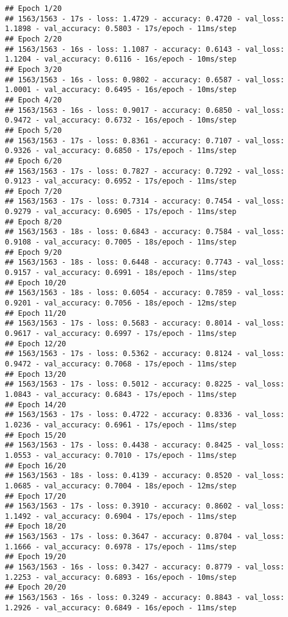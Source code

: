 \documentclass[
]{article}
\begin{document}
\begin{verbatim}
## Epoch 1/20
## 1563/1563 - 17s - loss: 1.4729 - accuracy: 0.4720 - val_loss: 1.1898 - val_accuracy: 0.5803 - 17s/epoch - 11ms/step
## Epoch 2/20
## 1563/1563 - 16s - loss: 1.1087 - accuracy: 0.6143 - val_loss: 1.1204 - val_accuracy: 0.6116 - 16s/epoch - 10ms/step
## Epoch 3/20
## 1563/1563 - 16s - loss: 0.9802 - accuracy: 0.6587 - val_loss: 1.0001 - val_accuracy: 0.6495 - 16s/epoch - 10ms/step
## Epoch 4/20
## 1563/1563 - 16s - loss: 0.9017 - accuracy: 0.6850 - val_loss: 0.9472 - val_accuracy: 0.6732 - 16s/epoch - 10ms/step
## Epoch 5/20
## 1563/1563 - 17s - loss: 0.8361 - accuracy: 0.7107 - val_loss: 0.9326 - val_accuracy: 0.6850 - 17s/epoch - 11ms/step
## Epoch 6/20
## 1563/1563 - 17s - loss: 0.7827 - accuracy: 0.7292 - val_loss: 0.9123 - val_accuracy: 0.6952 - 17s/epoch - 11ms/step
## Epoch 7/20
## 1563/1563 - 17s - loss: 0.7314 - accuracy: 0.7454 - val_loss: 0.9279 - val_accuracy: 0.6905 - 17s/epoch - 11ms/step
## Epoch 8/20
## 1563/1563 - 18s - loss: 0.6843 - accuracy: 0.7584 - val_loss: 0.9108 - val_accuracy: 0.7005 - 18s/epoch - 11ms/step
## Epoch 9/20
## 1563/1563 - 18s - loss: 0.6448 - accuracy: 0.7743 - val_loss: 0.9157 - val_accuracy: 0.6991 - 18s/epoch - 11ms/step
## Epoch 10/20
## 1563/1563 - 18s - loss: 0.6054 - accuracy: 0.7859 - val_loss: 0.9201 - val_accuracy: 0.7056 - 18s/epoch - 12ms/step
## Epoch 11/20
## 1563/1563 - 17s - loss: 0.5683 - accuracy: 0.8014 - val_loss: 0.9617 - val_accuracy: 0.6997 - 17s/epoch - 11ms/step
## Epoch 12/20
## 1563/1563 - 17s - loss: 0.5362 - accuracy: 0.8124 - val_loss: 0.9472 - val_accuracy: 0.7068 - 17s/epoch - 11ms/step
## Epoch 13/20
## 1563/1563 - 17s - loss: 0.5012 - accuracy: 0.8225 - val_loss: 1.0843 - val_accuracy: 0.6843 - 17s/epoch - 11ms/step
## Epoch 14/20
## 1563/1563 - 17s - loss: 0.4722 - accuracy: 0.8336 - val_loss: 1.0236 - val_accuracy: 0.6961 - 17s/epoch - 11ms/step
## Epoch 15/20
## 1563/1563 - 17s - loss: 0.4438 - accuracy: 0.8425 - val_loss: 1.0553 - val_accuracy: 0.7010 - 17s/epoch - 11ms/step
## Epoch 16/20
## 1563/1563 - 18s - loss: 0.4139 - accuracy: 0.8520 - val_loss: 1.0685 - val_accuracy: 0.7004 - 18s/epoch - 12ms/step
## Epoch 17/20
## 1563/1563 - 17s - loss: 0.3910 - accuracy: 0.8602 - val_loss: 1.1492 - val_accuracy: 0.6904 - 17s/epoch - 11ms/step
## Epoch 18/20
## 1563/1563 - 17s - loss: 0.3647 - accuracy: 0.8704 - val_loss: 1.1666 - val_accuracy: 0.6978 - 17s/epoch - 11ms/step
## Epoch 19/20
## 1563/1563 - 16s - loss: 0.3427 - accuracy: 0.8779 - val_loss: 1.2253 - val_accuracy: 0.6893 - 16s/epoch - 10ms/step
## Epoch 20/20
## 1563/1563 - 16s - loss: 0.3249 - accuracy: 0.8843 - val_loss: 1.2926 - val_accuracy: 0.6849 - 16s/epoch - 11ms/step
\end{verbatim}
\end{document}
